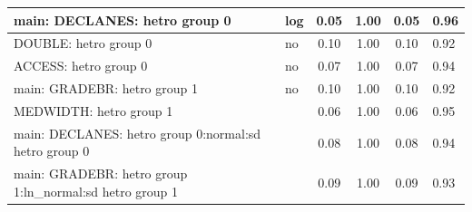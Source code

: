 \begin{table}
\begin{center}
\begin{tabular}{|l|l|c|c|c|l|}
			\hline
			main: DECLANES: hetro group 0 & log & 0.05 & 1.00 & 0.05 & 0.96 \\
			\hline
			DOUBLE: hetro group 0 & no & 0.10 & 1.00 & 0.10 & 0.92 \\
			\hline
			ACCESS: hetro group 0 & no & 0.07 & 1.00 & 0.07 & 0.94 \\
			\hline
			main: GRADEBR: hetro group 1 & no & 0.10 & 1.00 & 0.10 & 0.92 \\
			\hline
			MEDWIDTH: hetro group 1 &  & 0.06 & 1.00 & 0.06 & 0.95 \\
			\hline
			main: DECLANES: hetro group 0:normal:sd  hetro group 0 &  & 0.08 & 1.00 & 0.08 & 0.94 \\
			\hline
			main: GRADEBR: hetro group 1:ln_normal:sd  hetro group 1 &  & 0.09 & 1.00 & 0.09 & 0.93 \\
			\hline
		\end{tabular}
	\end{center}
\end{table}